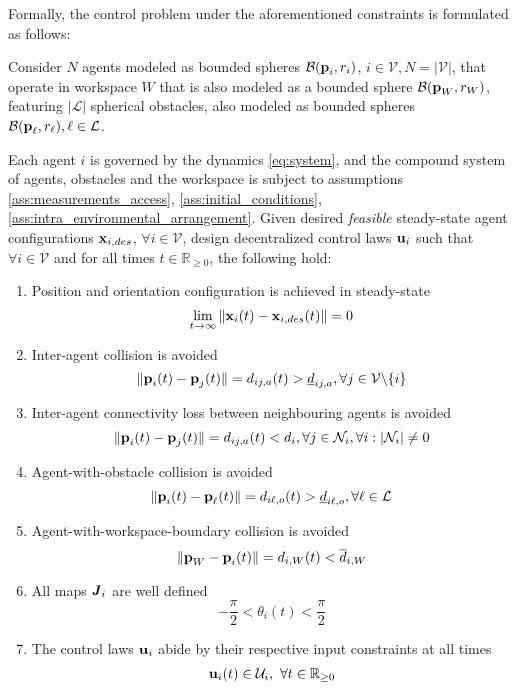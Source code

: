 Formally, the control problem under the aforementioned constraints is
formulated as follows:

\begin{bg_box}
\begin{problem}
  Consider $N$ agents modeled as bounded spheres $\mathcal{B}(\bm{\mathbf{p}}_i, r_i)$,
  $i \in \mathcal{V}, N = |\mathcal{V}|$, that operate in workspace $W$ that is
  also modeled as a bounded sphere $\mathcal{B}(\bm{\mathbf{p}}_W,r_W)$,
  featuring $|\mathcal{L}|$ spherical obstacles, also modeled as bounded
  spheres $\mathcal{B}(\bm{\mathbf{p}}_{\ell}, r_{\ell}), \ell \in \mathcal{L}$.

  Each agent $i$ is governed by the dynamics \eqref{eq:system}, and the compound
  system of agents, obstacles and the workspace is subject to assumptions
  \eqref{ass:measurements_access}, \eqref{ass:initial_conditions},
  \eqref{ass:intra_environmental_arrangement}. Given desired \textit{feasible}
  steady-state agent configurations $\bm{\mathbf{x}}_{i,des}$,
  $\forall i \in \mathcal{V}$, design decentralized control laws
  $\bm{\mathbf{u}}_i$ such that $\forall i \in \mathcal{V}$ and for all times $t \in \mathbb{R}_{\geq 0}$,
  the following hold:

  \begin{enumerate}

    \item Position and orientation configuration is achieved in steady-state
      $$\lim_{t \to \infty} \|\bm{\mathbf{x}}_i(t) - \bm{\mathbf{x}}_{i,des}(t)\| = 0$$

    \item Inter-agent collision is avoided
      $$\|\bm{\mathbf{p}}_i(t) - \bm{\mathbf{p}}_j(t)\| = d_{ij,a}(t) > \underline{d}_{ij,a},
      \forall j \in \mathcal{V} \backslash \{i\}$$

    \item Inter-agent connectivity loss between neighbouring agents is avoided
      $$ \|\bm{\mathbf{p}}_i(t) - \bm{\mathbf{p}}_j(t)\| = d_{ij,a} (t) < d_i,
      \forall j \in \mathcal{N}_i, \forall i : |\mathcal{N}_i| \not= 0$$

    \item Agent-with-obstacle collision is avoided
      $$ \|\bm{\mathbf{p}}_i(t) - \bm{\mathbf{p}}_{\ell}(t)\| = d_{i\ell,o} (t) > \underline{d}_{i\ell,o},
      \forall \ell \in \mathcal{L}$$

    \item Agent-with-workspace-boundary collision is avoided
      $$ \|\bm{\mathbf{p}}_W - \bm{\mathbf{p}}_i(t)\| = d_{i,W} (t) < \overline{d}_{i,W}$$

    \item All maps $\bm{\mathit{J}}_i$ are well defined
      $$- \frac{\pi}{2} < \theta_i(t) < \frac{\pi}{2}$$

    \item The control laws $\bm{\mathbf{u}}_i$ abide by their respective input constraints
      at all times
      $$\bm{\mathbf{u}}_i(t) \in \mathcal{U}_i,\ \forall t \in \mathbb{R}_{\geq 0} $$

  \end{enumerate}
\label{problem}
\end{problem}
\end{bg_box}
